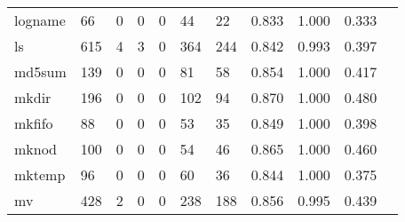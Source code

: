 \begin{longtable}{lp{1.10cm}p{1.10cm}p{1.10cm}p{1.10cm}p{1.10cm}p{1.10cm}p{1.10cm}p{1.10cm}p{1.10cm}p{1.10cm}}
logname   &                     66 &                                  0 &                                 0 &                                0 &                                44 &                              22 &                          0.833 &                                 1.000 &                               0.333 \\
ls        &                    615 &                                  4 &                                 3 &                                0 &                               364 &                             244 &                          0.842 &                                 0.993 &                               0.397 \\
md5sum    &                    139 &                                  0 &                                 0 &                                0 &                                81 &                              58 &                          0.854 &                                 1.000 &                               0.417 \\
mkdir     &                    196 &                                  0 &                                 0 &                                0 &                               102 &                              94 &                          0.870 &                                 1.000 &                               0.480 \\
mkfifo    &                     88 &                                  0 &                                 0 &                                0 &                                53 &                              35 &                          0.849 &                                 1.000 &                               0.398 \\
mknod     &                    100 &                                  0 &                                 0 &                                0 &                                54 &                              46 &                          0.865 &                                 1.000 &                               0.460 \\
mktemp    &                     96 &                                  0 &                                 0 &                                0 &                                60 &                              36 &                          0.844 &                                 1.000 &                               0.375 \\
mv        &                    428 &                                  2 &                                 0 &                                0 &                               238 &                             188 &                          0.856 &                                 0.995 &                               0.439 \\

\end{longtable}
